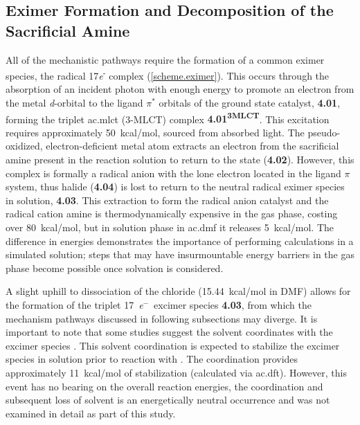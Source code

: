 \subsection{Eximer Formation and Decomposition of the Sacrificial Amine}\label{ss.initiation}

All of the mechanistic pathways require the formation of a common eximer species, the radical 17\textit{e}\textsuperscript{-} complex (\autoref{scheme.eximer}). This occurs through the absorption of an incident photon with enough energy to promote an electron from the metal \textit{d}-orbital to the ligand $\pi^\ast$ orbitals of the ground state catalyst, \textbf{4.01}, forming the triplet \acrlong{ac.mlct} (3-MLCT) complex \textbf{4.01\textsuperscript{3MLCT}}. This excitation requires approximately 50~kcal/mol, sourced from absorbed light. The pseudo-oxidized, electron-deficient metal atom extracts an electron from the sacrificial amine present in the reaction solution to return to the  state (\textbf{4.02}). However, this complex is formally a radical anion with the lone electron located in the ligand $\pi$ system, thus halide (\textbf{4.04}) is lost to return to the neutral radical eximer species in solution, \textbf{4.03}. This extraction to form the radical anion catalyst and the radical cation amine is thermodynamically expensive in the gas phase, costing over 80~kcal/mol, but in solution phase in \gls{ac.dmf} it releases 5~kcal/mol. The difference in energies demonstrates the importance of performing calculations in a simulated solution; steps that may have insurmountable energy barriers in the gas phase become possible once solvation is considered.

A slight uphill to dissociation of the chloride (15.44~kcal/mol in DMF) allows for the formation of the triplet 17~\textit{e}$^-$~excimer species \textbf{4.03}, from which the  mechanism pathways discussed in following subsections may diverge. It is important to note that some studies suggest the solvent coordinates with the excimer species \autocite{morris2009, kou2014}. This solvent coordination is expected to stabilize the excimer species in solution prior to reaction with \autocite{fujita2004}. The coordination provides approximately 11~kcal/mol of stabilization (calculated via \gls{ac.dft}). However, this event has no bearing on the overall reaction energies, the coordination and subsequent loss of solvent is an energetically neutral occurrence and was not examined in detail as part of this study.

